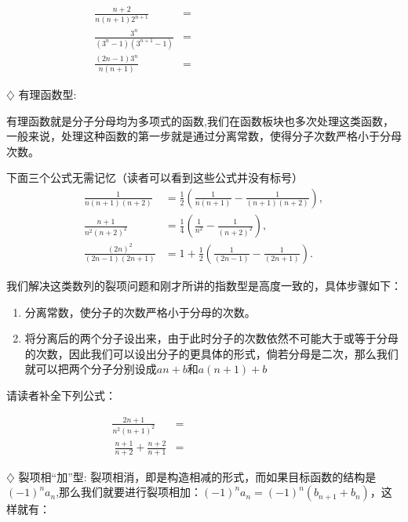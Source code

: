 \documentclass{article}
\begin{document}
\begin{align*}
\frac{n+2}{n(n+1)2^{n+1}} &= \;\;\;\;\;\;\;\;\;\;\;\;\;\;\;\;\;\;\;\; \;\;\;\;\;\;\;\;\;\;\;\;\;\;\;\;\;\;\;\;\\
\frac{3^n}{(3^n - 1)(3^{n+1} - 1)} &=   \\
\frac{(2n-1)3^n}{n(n+1)} &= 
\end{align*}

$\diamondsuit$ 有理函数型:
\vspace{1\baselineskip}

\begin{tcolorbox}[colback=blue!10,colframe=blue!70!black,title=]
有理函数就是分子分母均为多项式的函数,我们在函数板块也多次处理这类函数，一般来说，处理这种函数的第一步就是通过分离常数，使得分子次数严格小于分母次数。
\end{tcolorbox}

下面三个公式无需记忆（读者可以看到这些公式并没有标号）
\begin{align*}
\frac{1}{n(n+1)(n+2)} &= \frac{1}{2}\left( \frac{1}{n(n+1)} - \frac{1}{(n+1)(n+2)} \right), \\
\frac{n+1}{n^2(n+2)^2} &= \frac{1}{4}\left( \frac{1}{n^2} - \frac{1}{(n+2)^2} \right), \\
\frac{(2n)^2}{(2n-1)(2n+1)} &= 1 + \frac{1}{2}\left( \frac{1}{(2n-1)} - \frac{1}{(2n+1)} \right).
\end{align*}
\newpage

我们解决这类数列的裂项问题和刚才所讲的指数型是高度一致的，具体步骤如下：

\begin{enumerate}
\item 分离常数，使分子的次数严格小于分母的次数。
\item 将分离后的两个分子设出来，由于此时分子的次数依然不可能大于或等于分母的次数，因此我们可以设出分子的更具体的形式，倘若分母是二次，那么我们就可以把两个分子分别设成$an+b$和$a(n+1)+b$
\end{enumerate}

请读者补全下列公式：

\begin{align*}
\frac{2n+1}{n^2(n+1)^2} &=  \;\;\;\;\;\;\;\; \;\;\;\;\;\;\;\; \;\;\;\;\;\;\;\; \;\;\;\;\;\;\ \;\;\;\;\;\;\\\
\frac{n+1}{n+2} + \frac{n+2}{n+1} &= 
\end{align*}



$\diamondsuit$ 裂项相“加”型:
\vspace{1\baselineskip}
裂项相消，即是构造相减的形式，而如果目标函数的结构是${(-1)^na_n}$,那么我们就要进行裂项相加：$(-1)^na_n=(-1)^n(b_{n+1}+b_n)$，这样就有：
\end{document}
